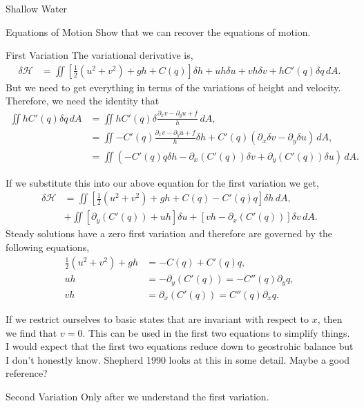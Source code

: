 \documentclass[12pt]{article}
\begin{document}
\begin{section}{Shallow Water}
\begin{subsection}{Equations of Motion}
        Show that we can recover the equations of motion.
    \end{subsection}

    \begin{subsection}{First Variation}
        The variational derivative is,
        \begin{align*}
            \delta \mathcal{H}
            &=  \iint \left[ \frac12  (u^2 + v^2) + g h  + C(q) \right] \delta h   +  uh  \delta u + vh \delta v   + h C'(q) \delta q \, dA.
        \end{align*}
        But we need to get everything in terms of the variations of height and velocity.  Therefore, we need the identity that
        \begin{align*}
            \iint h C'(q) \delta q \, dA
            &= \iint h C'(q) \delta \frac{ \partial_x v - \partial_y u+ f}{h} \, dA, \\
            &= \iint - C'(q) \frac{ \partial_x v - \partial_y u+ f}{h } \delta h + C'(q) \left(  \partial_x \delta v - \partial_y \delta u \right) \, dA, \\
            &= \iint \left( - C'(q) q \delta h - \partial_x ( C'(q) )  \delta v + \partial_y ( C'(q) ) \delta u \right) \, dA.
        \end{align*}

        If we substitute this into our above equation for the first variation we get,
        \begin{align*}
            \delta \mathcal{H}
            & =  \iint \left[ \frac12  (u^2 + v^2) + g h  + C(q)  - C'(q) q\right] \delta h     \, dA, \\
            & +  \iint \left[ \partial_y ( C'(q) ) + u h \right] \delta u  +  \left[ vh - \partial_x ( C'(q) )  \right] \delta v \, dA.
        \end{align*}
        Steady solutions have a zero first variation and therefore are governed by the following equations,
        \begin{align*}
            \frac12  (u^2 + v^2) + g h & = - C(q)  + C'(q) q ,\\
            u h & = - \partial_y ( C'(q) ) = - C''(q) \partial_y q, \\
            vh  & = \partial_x ( C'(q) ) = C''(q) \partial_x q.
        \end{align*}

        If we restrict ourselves to basic states that are invariant with respect to $x$, then we find that $v= 0$.  This can be used in the first two equations to simplify things.  I would expect that the first two equations reduce down to geostrohic balance but I don't honestly know.  Shepherd 1990 looks at this in some detail.  Maybe a good reference?
    \end{subsection}

    \begin{subsection}{Second Variation}
        Only after we understand the first variation.
    \end{subsection}
\end{section}
\end{document}
